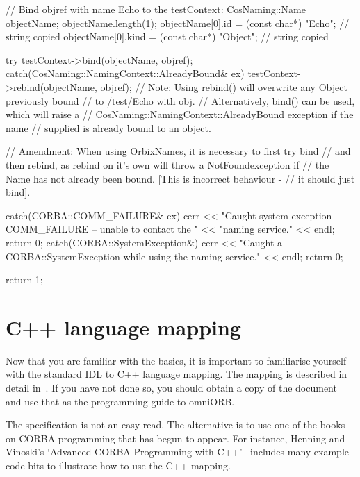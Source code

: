 \documentclass[11pt,twoside,a4paper]{book}
\begin{document}
\begin{cxxlisting}
{{    // Bind objref with name Echo to the testContext:
    CosNaming::Name objectName;
    objectName.length(1);
    objectName[0].id   = (const char*) "Echo";   // string copied
    objectName[0].kind = (const char*) "Object"; // string copied

    try {
      testContext->bind(objectName, objref);
    }
    catch(CosNaming::NamingContext::AlreadyBound& ex) {
      testContext->rebind(objectName, objref);
    }
    // Note: Using rebind() will overwrite any Object previously bound
    //       to /test/Echo with obj.
    //       Alternatively, bind() can be used, which will raise a
    //       CosNaming::NamingContext::AlreadyBound exception if the name
    //       supplied is already bound to an object.

    // Amendment: When using OrbixNames, it is necessary to first try bind
    // and then rebind, as rebind on it's own will throw a NotFoundexception if
    // the Name has not already been bound. [This is incorrect behaviour -
    // it should just bind].
  }
  catch(CORBA::COMM_FAILURE& ex) {
    cerr << "Caught system exception COMM_FAILURE -- unable to contact the "
         << "naming service." << endl;
    return 0;
  }
  catch(CORBA::SystemException&) {
    cerr << "Caught a CORBA::SystemException while using the naming service."
	 << endl;
    return 0;
  }

  return 1;
}
\end{cxxlisting}





\chapter{C++ language mapping}

Now that you are familiar with the basics, it is important to
familiarise yourself with the standard IDL to C++ language mapping.
The mapping is described in detail in~\cite{cxxmapping}. If you have
not done so, you should obtain a copy of the document and use that as
the programming guide to omniORB.

The specification is not an easy read. The alternative is to use one
of the books on CORBA programming that has begun to appear. For
instance, Henning and Vinoski's `Advanced CORBA Programming with
C++'~\cite{henning1999} includes many example code bits to illustrate
how to use the C++ mapping.
\end{document}
